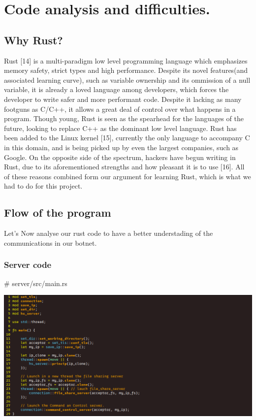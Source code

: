 \documentclass[../main.tex]{subfiles}
\begin{document}
	\chapter{Code analysis and difficulties.}


	\section{Why Rust?}


    Rust [14] is a multi-paradigm low level programming language which emphasizes memory safety, strict types and high performance. 
    Despite its novel features(and associated learning curve), such as variable ownership and its ommission of a null variable, it is already a loved language among developers, which forces the developer to write safer and more performant code.
    Despite it lacking as many footguns as C/C++, it allows a great deal of control over what happens in a program. 
    Though young, Rust is seen as the spearhead for the languages of the future, looking to replace C++ as the dominant low level language. 
    Rust has been added to the Linux kernel [15], currently the only language to accompany C in this domain, and is being picked up by even the largest companies, such as Google. On the opposite side of the spectrum, hackers have begun writing in Rust, due to its aforementioned strengths and how pleasant it is to use [16]. 
    All of these reasons combined form our argument for learning Rust, which is what we had to do for this project.

	\vspace{10pt}

	\section{Flow of the program}

    Let's Now analyse our rust code to have a better understading of the communications in our botnet.
	\vspace{10pt}

	\subsection{Server code}

    \# server/src/main.rs

    \includegraphics[width=450pt]{server_main.png}
\end{document}

